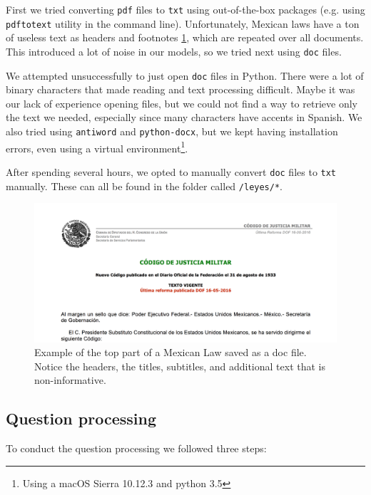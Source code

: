 \documentclass[letterpaper, margin=1in]{article}
\begin{document}
First we tried converting \texttt{pdf} files to \texttt{txt} using out-of-the-box packages (e.g. using \texttt{pdftotext} utility in the command line). Unfortunately, Mexican laws have a ton of useless text as headers and footnotes \ref{fig:header}, which are repeated over all documents. This introduced a lot of noise in our models, so we tried next using \texttt{doc} files.

We attempted unsuccessfully to just open \texttt{doc} files in Python. There were a lot of binary characters that made reading and text processing difficult. Maybe it was our lack of experience opening files, but we could not find a way to retrieve only the text we needed, especially since many characters have accents in Spanish. We also tried using \texttt{antiword} and \texttt{python-docx}, but we kept having installation errors, even using a virtual environment\footnote{Using a macOS Sierra 10.12.3 and python 3.5}.

After spending several hours, we opted to manually convert \texttt{doc} files to \texttt{txt} manually. These can all be found in the folder called \texttt{/leyes/*}.

\begin{figure}
\centering
\includegraphics[width=1\textwidth]{header.png}
\caption{\label{fig:header}Example of the top part of a Mexican Law saved as a doc file. Notice the headers, the titles, subtitles, and additional text that is non-informative.}
\end{figure}

\subsection{Question processing}
To conduct the question processing we followed three steps:
\end{document}
